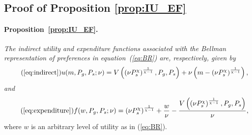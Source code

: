 \documentclass[12pt,a4paper]{article}
\begin{document}
\begin{appendices}
\subsection{Proof of Proposition \ref{prop:IU_EF}} \label{app:IU_EF}

\paragraph{Proposition~\ref{prop:IU_EF}.}

{\it The indirect utility and expenditure functions associated with the Bellman representation of preferences in equation~\textnormal{(\ref{eq:BR})} are, respectively, given by
\begin{equation}\tag{\ref{eq:indirect}}
u(m, P_{g}, P_{s}; \nu) = 
V\left( \left( \nu P_{s}^\chi \right)^{\frac{1}{\chi - 1}}, P_{g}, P_{s} \right)
+ \nu \left( m - \left( \nu P_{s}^\chi \right)^{\frac{1}{\chi - 1}} \right),
\end{equation}
and}
\begin{equation}\tag{\ref{eq:expenditure}}
f(w, P_{g}, P_{s}; \nu) = 
\left( \nu P_{s}^\chi \right)^{\frac{1}{\chi - 1}} 
+ \frac{w}{\nu}
- \frac{ V\left( \left( \nu P_{s}^\chi \right)^{\frac{1}{\chi - 1}}, P_{g}, P_{s} \right) }{\nu},
\end{equation}
where $w$ is an arbitrary level of utility as in (\ref{eq:BR}).


\end{appendices}
\end{document}
